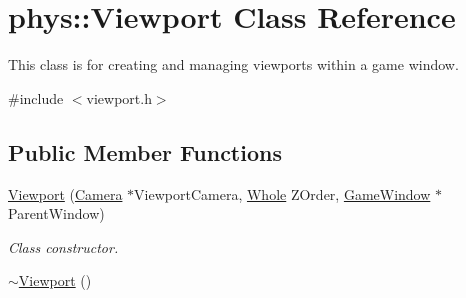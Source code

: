 \hypertarget{classphys_1_1Viewport}{
\section{phys::Viewport Class Reference}
\label{d5/d62/classphys_1_1Viewport}
}


This class is for creating and managing viewports within a game window.  




{\ttfamily \#include $<$viewport.h$>$}

\subsection*{Public Member Functions}
\begin{DoxyCompactItemize}
\item 
\hyperlink{classphys_1_1Viewport_a83634ee2144fadd80fec3028885b92f2}{Viewport} (\hyperlink{classphys_1_1Camera}{Camera} $\ast$ViewportCamera, \hyperlink{namespacephys_a460f6bc24c8dd347b05e0366ae34f34a}{Whole} ZOrder, \hyperlink{classphys_1_1GameWindow}{GameWindow} $\ast$ParentWindow)
\begin{DoxyCompactList}\small\item\em Class constructor. \item\end{DoxyCompactList}\item 
\hypertarget{classphys_1_1Viewport_a2ac669dde60b69641d309e81c3108db4}{
\hyperlink{classphys_1_1Viewport_a2ac669dde60b69641d309e81c3108db4}{$\sim$Viewport} ()}
\label{d5/d62/classphys_1_1Viewport_a2ac669dde60b69641d309e81c3108db4}


\end{DoxyCompactItemize}
